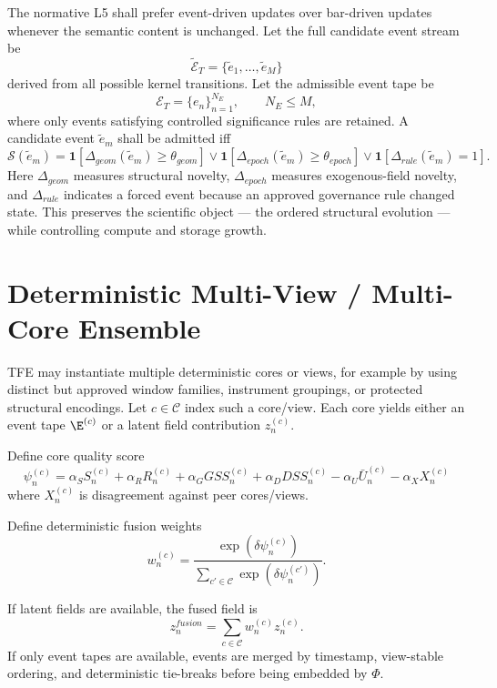 The normative L5 shall prefer event-driven updates over bar-driven updates whenever the semantic content is unchanged. Let the full candidate event stream be
\[
\widetilde{\mathcal{E}}_T = \{\tilde e_1,\dots,\tilde e_M\}
\]
derived from all possible kernel transitions. Let the admissible event tape be
\[
\mathcal{E}_T = \{e_n\}_{n=1}^{N_E},\qquad N_E\le M,
\]
where only events satisfying controlled significance rules are retained. A candidate event $\tilde e_m$ shall be admitted iff
\[
\mathcal{S}(\tilde e_m)=\mathbf{1}[\Delta_{geom}(\tilde e_m)\ge \theta_{geom}]\vee \mathbf{1}[\Delta_{epoch}(\tilde e_m)\ge \theta_{epoch}]\vee \mathbf{1}[\Delta_{rule}(\tilde e_m)=1].
\]
Here $\Delta_{geom}$ measures structural novelty, $\Delta_{epoch}$ measures exogenous-field novelty, and $\Delta_{rule}$ indicates a forced event because an approved governance rule changed state. This preserves the scientific object --- the ordered structural evolution --- while controlling compute and storage growth.

\section{Deterministic Multi-View / Multi-Core Ensemble}

TFE may instantiate multiple deterministic cores or views, for example by using distinct but approved window families, instrument groupings, or protected structural encodings. Let $c\in\mathcal{C}$ index such a core/view. Each core yields either an event tape $\E^{(c)}$ or a latent field contribution $z_n^{(c)}$.

Define core quality score
\[
\psi_n^{(c)} = \alpha_S S_n^{(c)} + \alpha_R R_n^{(c)} + \alpha_G GSS_n^{(c)} + \alpha_D DSS_n^{(c)} - \alpha_U \bar U_n^{(c)} - \alpha_X X_n^{(c)}
\]
where $X_n^{(c)}$ is disagreement against peer cores/views.

Define deterministic fusion weights
\[
w_n^{(c)} = \frac{\exp(\delta\psi_n^{(c)})}{\sum_{c'\in\mathcal{C}}\exp(\delta\psi_n^{(c')})}.
\]

If latent fields are available, the fused field is
\[
z_n^{fusion}=\sum_{c\in\mathcal{C}} w_n^{(c)} z_n^{(c)}.
\]
If only event tapes are available, events are merged by timestamp, view-stable ordering, and deterministic tie-breaks before being embedded by $\Phi$.


